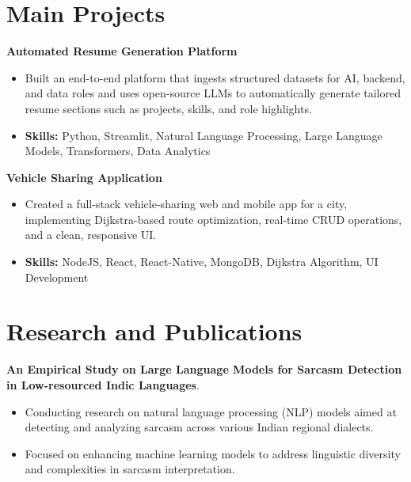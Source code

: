 \documentclass[a4paper,11pt]{article}
\begin{document}
\section{\textbf{Main Projects}}

\vspace{1mm}
  \textbf{Automated Resume Generation Platform  }
\vspace{-1.5mm} %
\begin{itemize}
  \item Built an end-to-end platform that ingests structured datasets for AI, backend, and data roles and uses open-source LLMs to automatically generate tailored resume sections such as projects, skills, and role highlights.
\vspace{-3mm}
  \item \textbf{Skills:} Python, Streamlit, Natural Language Processing, Large Language Models, Transformers, Data Analytics
\end{itemize}


\vspace{1mm}
   \textbf{Vehicle Sharing Application }
\vspace{-1.5mm} %
\begin{itemize}
  \item Created a full-stack vehicle-sharing web and mobile app for a city, implementing Dijkstra-based route optimization, real-time CRUD operations, and a clean, responsive UI.
\vspace{-3mm}
  \item \textbf{Skills:} NodeJS, React, React-Native, MongoDB, Dijkstra Algorithm, UI Development
\end{itemize}



\section{\textbf{Research and Publications} \hfill }
\vspace{1mm}
  \textbf{An Empirical Study on Large Language Models for Sarcasm Detection in Low-resourced Indic Languages}.
\vspace{-1mm} %
\begin{itemize}
  \item Conducting research on natural language processing (NLP) models aimed at detecting and analyzing sarcasm across various Indian regional dialects.
\vspace{-3mm}
  \item Focused on enhancing machine learning models to address linguistic diversity and complexities in sarcasm interpretation.
\end{itemize}
\end{document}
